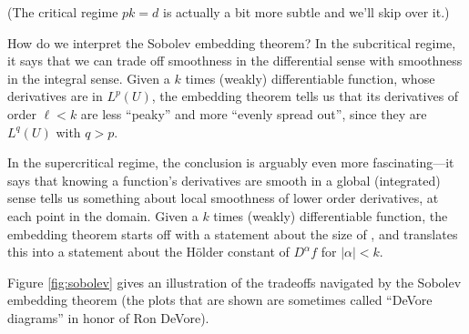 \documentclass{article}
\begin{document}

\medskip
(The critical regime $pk = d$ is actually a bit more subtle and we'll skip over
it.)  

How do we interpret the Sobolev embedding theorem? In the subcritical regime, it
says that we can trade off smoothness in the differential sense with smoothness
in the integral sense. Given a $k$ times (weakly) differentiable function, whose
derivatives are in $L^p(U)$, the embedding theorem tells us that its derivatives
of order $\ell < k$ are less ``peaky'' and more ``evenly spread out'', since
they are $L^q(U)$ with $q > p$.

In the supercritical regime, the conclusion is arguably even more
fascinating---it says that knowing a function's derivatives are smooth in a
global (integrated) sense tells us something about local smoothness of lower
order derivatives, at each point in the domain. Given a $k$ times (weakly)
differentiable function, the embedding theorem starts off with a statement about
the size of , and
translates this into a statement about the H{\"o}lder constant of $D^\alpha f$
for $|\alpha| < k$.      

Figure \ref{fig:sobolev} gives an illustration of the tradeoffs navigated by the
Sobolev embedding theorem (the plots that are shown are sometimes called
``DeVore diagrams'' in honor of Ron DeVore).  
\end{document}
